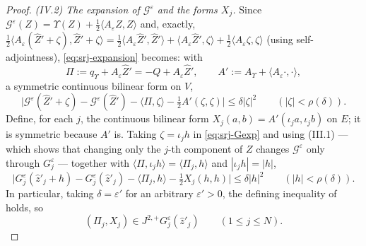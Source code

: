 \begin{proof}
\emph{(IV.2) The expansion of $\mathcal G^\varepsilon$ and the forms $X_j$.}
Since $\mathcal G^\varepsilon(Z)=\Upsilon(Z)
+\tfrac12\langle A_\varepsilon Z,Z\rangle$ and, exactly,
$\tfrac12\langle A_\varepsilon(\widehat Z'+\zeta),\widehat Z'+\zeta\rangle
=\tfrac12\langle A_\varepsilon\widehat Z',\widehat Z'\rangle
+\langle A_\varepsilon\widehat Z',\zeta\rangle
+\tfrac12\langle A_\varepsilon\zeta,\zeta\rangle$ (using self-adjointness),
\eqref{eq:srj-expansion} becomes: with
\[
  \Pi:=q_\Upsilon+A_\varepsilon\widehat Z'=-Q+A_\varepsilon\widehat Z',
  \qquad
  A':=A_\Upsilon+\langle A_\varepsilon\cdot,\cdot\rangle,
\]
a symmetric continuous bilinear form on $V$,
\begin{equation}\label{eq:srj-Gexp}
  \bigl|\mathcal G^\varepsilon(\widehat Z'+\zeta)-\mathcal G^\varepsilon(\widehat Z')
    -\langle\Pi,\zeta\rangle-\tfrac12A'(\zeta,\zeta)\bigr|\le\delta|\zeta|^2
  \qquad(|\zeta|<\rho(\delta)).
\end{equation}
Define, for each $j$, the continuous bilinear form
$X_j(a,b)=A'(\iota_ja,\iota_jb)$ on $E$; it is symmetric because $A'$ is.
Taking $\zeta=\iota_jh$ in \eqref{eq:srj-Gexp} and using (III.1) --- which shows
that changing only the $j$-th component of $Z$ changes
$\mathcal G^\varepsilon$ only through $G_j^\varepsilon$ --- together with
$\langle\Pi,\iota_jh\rangle=\langle\Pi_j,h\rangle$ and $|\iota_jh|=|h|$,
\begin{equation}\label{eq:srj-Gjexp}
  \bigl|G_j^\varepsilon(\widehat z'_j+h)-G_j^\varepsilon(\widehat z'_j)
   -\langle\Pi_j,h\rangle-\tfrac12X_j(h,h)\bigr|\le\delta|h|^2
  \qquad(|h|<\rho(\delta)).
\end{equation}
In particular, taking $\delta=\varepsilon'$ for an arbitrary $\varepsilon'>0$,
the defining inequality of  holds, so
\begin{equation}\label{eq:srj-jet}
  (\Pi_j,X_j)\in J^{2,+}G_j^\varepsilon(\widehat z'_j)\qquad(1\le j\le N).
\end{equation}


\end{proof}
